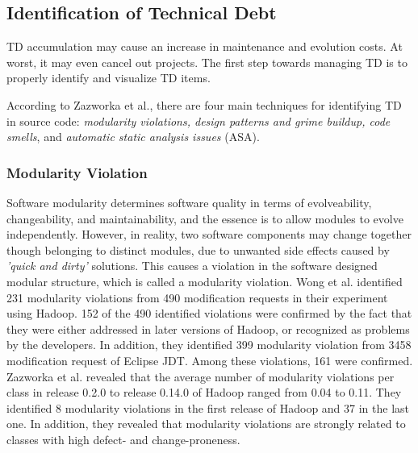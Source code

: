 \subsection{Identification of Technical Debt}
TD accumulation may cause an increase in maintenance and evolution costs. At worst, it may even cancel out projects. The first step towards managing TD is to properly identify and visualize  TD items. 

According to Zazworka et al.\cite{zazworka2014comparing}, there are four main techniques for identifying TD in source code: \textit{modularity violations, design patterns and grime buildup, code smells}, and \textit{automatic static analysis issues} (ASA). 

\subsubsection{Modularity Violation}
Software modularity determines software quality in terms of evolveability, changeability, and maintainability\cite{huynh2007evolutionary}, and the essence is to allow modules to evolve independently. However, in reality, two software components may change together though belonging to distinct modules, due to unwanted side effects caused by \textit{'quick and dirty'} solutions\cite{wong2011detecting,zazworka2014comparing}. This causes a violation in the software designed modular structure, which is called a modularity violation. Wong et al.\cite{wong2011detecting} identified 231 modularity violations from 490 modification requests in their experiment using Hadoop. 152 of the 490 identified violations were confirmed by the fact that they were either addressed in later versions of Hadoop, or recognized as problems by the developers. In addition, they identified 399 modularity violation from 3458 modification request of Eclipse JDT\cite{wong2011detecting}. Among these violations, 161 were confirmed. Zazworka et al.\cite{zazworka2014comparing} revealed that the average number of modularity violations per class in release 0.2.0 to release 0.14.0 of Hadoop ranged from 0.04 to 0.11. They identified 8 modularity violations in the first release of Hadoop and 37 in the last one. In addition, they revealed that modularity violations are strongly related to classes with high defect- and change-proneness. 



